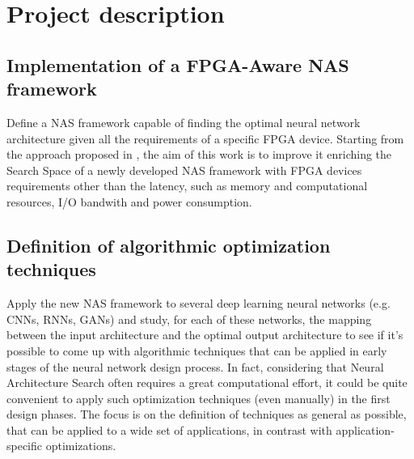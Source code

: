 \documentclass[11pt,a4paper]{article}
\begin{document}
\section{Project description}
\subsection{Implementation of a FPGA-Aware NAS framework}
Define a NAS framework capable of finding the optimal neural network architecture given all the requirements of a specific FPGA device. Starting from the approach proposed in \cite{jiang_nas_fpga_2019}, the aim of this work is to improve it enriching the Search Space of a newly developed NAS framework with FPGA devices requirements other than the latency, such as memory and computational resources, I/O bandwith and power consumption.
\subsection{Definition of algorithmic optimization techniques}
Apply the new NAS framework to several deep learning neural networks (e.g. CNNs, RNNs, GANs) and study, for each of these networks, the mapping between the input architecture and the optimal output architecture to see if it's possible to come up with algorithmic techniques that can be applied in early stages of the neural network design process. In fact, considering that Neural Architecture Search often requires a great computational effort, it could be quite convenient to apply such optimization techniques (even manually) in the first design phases. The focus is on the definition of techniques as general as possible, that can be applied to a wide set of applications, in contrast with application-specific optimizations.
\end{document}
